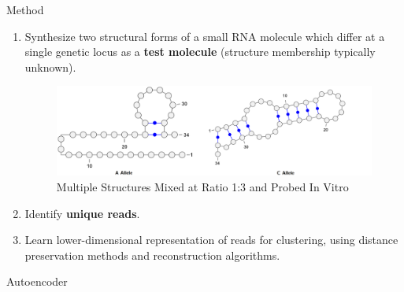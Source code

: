 \documentclass[final]{beamer}
\newlength{\onecolwid}
\begin{document}
\begin{frame}[t]
\begin{columns}[t]
\begin{column}{\onecolwid}
\begin{block}{Method}
\begin{enumerate}
\item Synthesize two structural forms of a small RNA molecule which differ at a single genetic locus as a \textbf{test molecule} (structure membership typically unknown).

\begin{figure}[!ht]
\includegraphics[width=0.9\linewidth]{images/alleles.png}
\caption{Multiple Structures Mixed at Ratio 1:3 and Probed In Vitro}
\end{figure}

\item Identify \textbf{unique reads}.
\item Learn lower-dimensional representation of reads for clustering, using distance preservation methods and reconstruction algorithms. 
\end{enumerate}
\end{block}

\begin{block}{Autoencoder}


\end{block}
\end{column}
\end{columns}
\end{frame}
\end{document}
